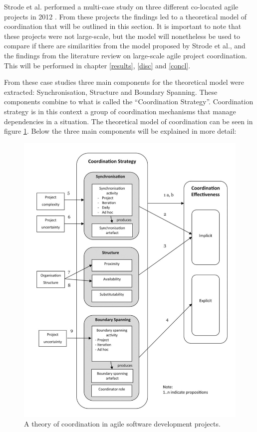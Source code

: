 Strode et al. performed a multi-case study on three different co-located agile projects in 2012 \cite{Strode2012}. From these projects the findings led to a theoretical model of coordination that will be outlined in this section. It is important to note that these projects were not large-scale, but the model will nonetheless be used to compare if there are similarities from the model proposed by Strode et al., and the findings from the literature review on large-scale agile project coordination. This will be performed in chapter \ref{results}, \ref{disc} and \ref{concl}.

From these case studies three main components for the theoretical model were extracted: Synchronisation, Structure and Boundary Spanning. These components combine to what is called the ``Coordination Strategy''. Coordination strategy is in this context a group of coordination mechanisms that manage dependencies in a situation. The theoretical model of coordination can be seen in figure \ref{strode}. Below the three main components will be explained in more detail:

\begin{figure}
\centering
\includegraphics[width=160mm]{images/Strode.pdf}
\caption{A theory of coordination in agile software development projects.}
\label{strode}
\end{figure}

